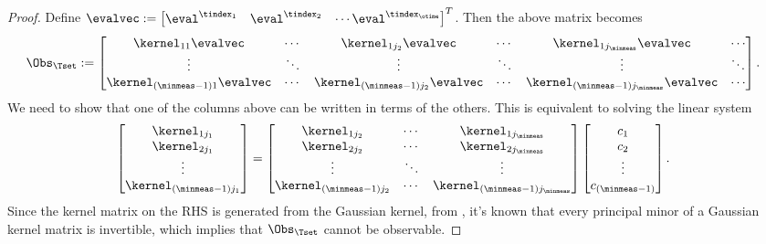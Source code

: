 \begin{proof}
	Define $\evalvec:= \begin{bmatrix}\eval^{\tindex_1} & \eval^{\tindex_2} & \cdots \eval^{\tindex_{\otime}}\end{bmatrix}^T$. 
	Then the above matrix becomes 
	\begin{align*}
	\Obs_{\Tset}
	&:= 
	\begin{bmatrix}
	\kernel_{11}\evalvec  & \cdots & \kernel_{1j_2}\evalvec & \cdots & \kernel_{1j_{\minmeas}}\evalvec & \cdots\\
	\vdots & \ddots & \vdots & \ddots &\vdots & \ddots\\
	\kernel_{(\minmeas-1)1}\evalvec  & \cdots & \kernel_{(\minmeas-1)j_2}\evalvec & \cdots & \kernel_{(\minmeas-1)j_{\minmeas}}\evalvec & \cdots
	\end{bmatrix}.
	\end{align*}
	We need to show that one of the columns above can be written in terms of the others. This is equivalent to solving the linear system
	\begin{align*}
	\begin{bmatrix}
	\kernel_{1j_1}\\
	\kernel_{2j_1}\\
	\vdots\\
	\kernel_{(\minmeas-1)j_1}
	\end{bmatrix}
	&=
	\begin{bmatrix}
	\kernel_{1j_2} & \cdots & \kernel_{1j_{\minmeas}}\\
	\kernel_{2j_2} & \cdots & \kernel_{2j_{\minmeas}}\\
	\vdots & \ddots & \vdots\\
	\kernel_{(\minmeas-1)j_2} & \cdots & \kernel_{(\minmeas-1)j_{\minmeas}}\\
	\end{bmatrix} 
	\begin{bmatrix}
	c_1\\
	c_2\\
	\vdots\\   
	c_{(\minmeas-1)}
	\end{bmatrix}. 
	\end{align*}
	Since the kernel matrix on the RHS is generated from the Gaussian kernel, from \cite{micchelli1984interpolation}, 
	it's known that every principal minor of a Gaussian kernel matrix is invertible, which implies that $\Obs_{\Tset}$ cannot be observable. 
\end{proof}


